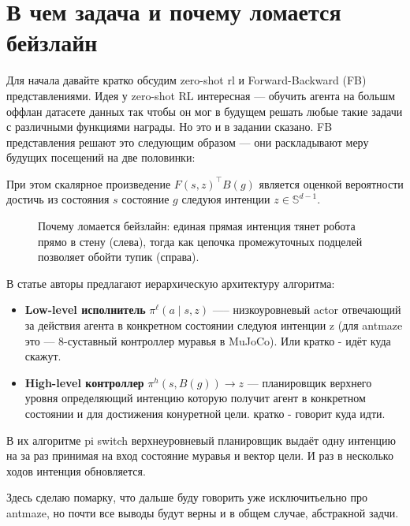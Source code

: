 \section{В чем задача и почему ломается бейзлайн}

Для начала давайте кратко обсудим zero-shot rl и Forward-Backward (FB) представлениями. Идея у zero-shot RL интересная --- обучить агента на большм оффлан датасете данных так чтобы он мог в будущем решать любые такие задачи с различными функциями награды. Но это и в задании сказано.
FB представления решают это следующим образом --- они раскладывают меру будущих посещений на две половинки:

При этом скалярное произведение $F(s, z)^\top B(g)$ является оценкой вероятности достичь из состояния $s$ состояние $g$ следуюя интенции $z \in \mathbb{S}^{d-1}$.

\begin{figure}[H]
    \centering
    
    \caption{Почему ломается бейзлайн: единая прямая интенция тянет робота прямо в стену (слева), тогда как цепочка промежуточных подцелей позволяет обойти тупик (справа).}
    \label{fig:single_vs_multi}
\end{figure}

В статье \cite{stojanovic2026switching} авторы предлагают иерархическую архитектуру алгоритма:
\begin{itemize}[leftmargin=*,noitemsep]
    \item \textbf{Low-level исполнитель} $\pi^\ell(a \mid s, z)$ —--  низкоуровневый actor отвечающий за действия агента в конкретном состоянии следуюя интенции z (для antmaze  это --- 8-суставный контроллер муравья в MuJoCo). Или кратко - идёт куда скажут.
    \item \textbf{High-level контроллер} $\pi^h(s, B(g)) \to z$ --- планировщик верхнего уровня определяющий интенцию которую получит агент в конкретном состоянии и для достижения конуретной цели. кратко - говорит куда идти.
\end{itemize}

В их алгоритме pi switch верхнеуровневый планировщик выдаёт одну интенцию на за раз принимая на вход состояние муравья и вектор цели. И раз в несколько ходов интенция обновляется. 

Здесь сделаю помарку, что дальше буду говорить уже исключитьельно про antmaze, но почти все выводы будут верны и в общем случае, абстракной задчи.

